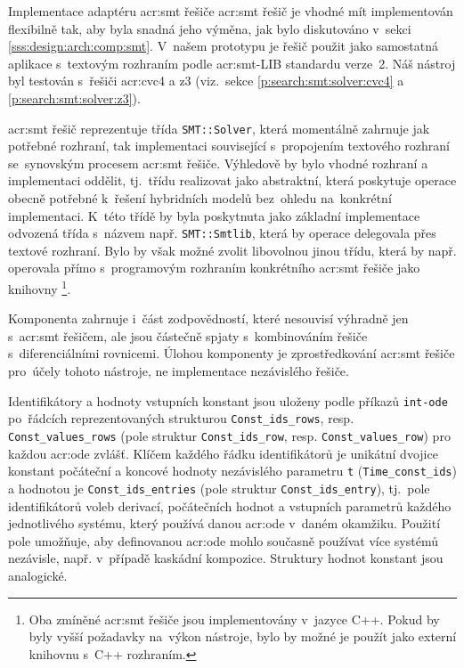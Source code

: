 \documentclass[thesis=M,czech]{FITthesis}[2012/06/26]
\newcommand{\acrlabel}[1]{acr:#1}
\newcommand{\acr}[1]{\acrshort{\acrlabel{#1}}}
\newcommand{\id}[1]{\texttt{#1}}
\newcommand{\rf}[1]{\ref{#1}}
\begin{document}
\begin{section}{Implementace adaptéru \acr{smt} řešiče}\label{s:impl:smt}
\acr{smt} řešič je vhodné mít implementován flexibilně tak,
aby byla snadná jeho výměna, jak bylo diskutováno
v~sekci \rf{sss:design:arch:comp:smt}.
V~našem prototypu je řešič použit jako samostatná aplikace
s~textovým rozhraním podle \acr{smt}-LIB standardu verze~2.
Náš nástroj byl testován s~řešiči \acr{cvc}4 a z3
(viz.~sekce \rf{p:search:smt:solver:cvc4} a \rf{p:search:smt:solver:z3}).

\acr{smt} řešič reprezentuje třída \id{SMT::\-Solver},
která momentálně zahrnuje jak potřebné rozhraní, tak implementaci
související s~propojením textového rozhraní
se~synovským procesem \acr{smt} řešiče.
Výhledově by bylo vhodné rozhraní a implementaci oddělit,
tj.~třídu realizovat jako abstraktní,
která poskytuje operace obecně potřebné
k~řešení hybridních modelů
bez~ohledu na~konkrétní implementaci.
K~této třídě by byla poskytnuta
jako základní implementace odvozená třída
s~názvem např. \id{SMT::\-Smtlib},
která by operace delegovala přes textové rozhraní.
Bylo by však možné zvolit libovolnou jinou třídu,
která by např. operovala přímo s~programovým
rozhraním konkrétního \acr{smt} řešiče jako knihovny%
\footnote{Oba zmíněné \acr{smt} řešiče jsou implementovány v~jazyce C++.
Pokud by byly vyšší požadavky na~výkon nástroje,
bylo by možné je použít jako externí knihovnu s~C++ rozhraním.}.

Komponenta zahrnuje i~část zodpovědností,
které nesouvisí výhradně jen s~\acr{smt} řešičem,
ale jsou částečně spjaty s~kombinováním
řešiče s~diferenciálními rovnicemi.
Úlohou komponenty je zprostředkování \acr{smt} řešiče
pro~účely tohoto nástroje,
ne implementace nezávislého řešiče.


\begin{paragraph}{Identifikátory a hodnoty}\label{p:impl:smt:consts}
vstupních konstant jsou uloženy podle příkazů \id{int\--ode}
po~řádcích reprezentovaných strukturou \id{Const\_\-ids\_\-rows},
resp. \id{Const\_\-values\_\-rows}
(pole struktur \id{Const\_\-ids\_\-row},
resp. \id{Const\_\-values\_\-row})
pro každou \acr{ode} zvlášť.
Klíčem každého řádku identifikátorů je unikátní dvojice konstant
počáteční a koncové hodnoty nezávislého parametru \id{t}
(\id{Time\_\-const\_\-ids})
a hodnotou je \id{Const\_\-ids\_\-entries}
(pole struktur \id{Const\_\-ids\_\-entry}),
tj.~pole identifikátorů voleb derivací, počátečních hodnot
a vstupních parametrů každého jednotlivého systému,
který používá danou \acr{ode} v~daném okamžiku.
Použití pole umožňuje,
aby definovanou \acr{ode}
mohlo současně používat více systémů nezávisle,
např. v~případě kaskádní kompozice.
Struktury hodnot konstant jsou analogické.
\end{paragraph} %


\end{section}
\end{document}
